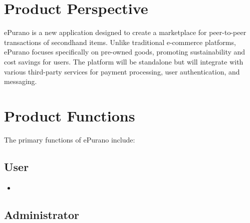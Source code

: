 \section{Product Perspective}
ePurano is a new application designed to create a marketplace for peer-to-peer transactions of secondhand items. Unlike traditional e-commerce platforms, ePurano focuses specifically on pre-owned goods, promoting sustainability and cost savings for users. The platform will be standalone but will integrate with various third-party services for payment processing, user authentication, and messaging.

\section{Product Functions}

The primary functions of ePurano include:

\subsection{User}
\begin{itemize}
    \item 
\end{itemize}
\subsection{Administrator}